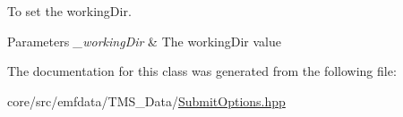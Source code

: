 To set the workingDir. 


\begin{DoxyParams}{Parameters}
{\em \_\-workingDir} & The workingDir value \\
\hline
\end{DoxyParams}


The documentation for this class was generated from the following file:\begin{DoxyCompactItemize}
\item 
core/src/emfdata/TMS\_\-Data/\hyperlink{SubmitOptions_8hpp}{SubmitOptions.hpp}\end{DoxyCompactItemize}
